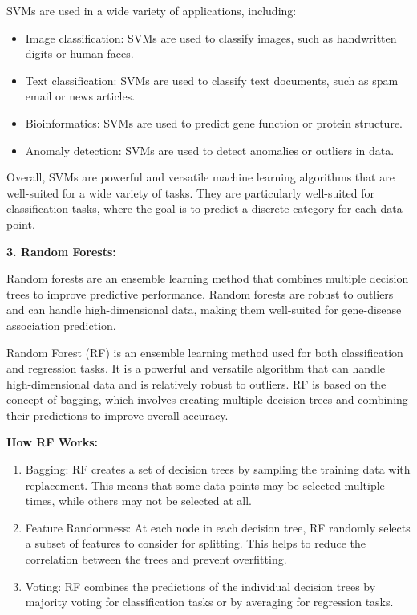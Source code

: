 SVMs are used in a wide variety of applications, including:

\begin{itemize}
    \item Image classification: SVMs are used to classify images, such as handwritten digits or human faces.

    \item Text classification: SVMs are used to classify text documents, such as spam email or news articles.

    \item Bioinformatics: SVMs are used to predict gene function or protein structure.

    \item Anomaly detection: SVMs are used to detect anomalies or outliers in data.

\end{itemize}
Overall, SVMs are powerful and versatile machine learning algorithms that are well-suited for a wide variety of tasks. They are particularly well-suited for classification tasks, where the goal is to predict a discrete category for each data point.

\textbf{3. Random Forests:}

Random forests are an ensemble learning method that combines multiple decision trees to improve predictive performance. Random forests are robust to outliers and can handle high-dimensional data, making them well-suited for gene-disease association prediction.

Random Forest (RF) is an ensemble learning method used for both classification and regression tasks. It is a powerful and versatile algorithm that can handle high-dimensional data and is relatively robust to outliers. RF is based on the concept of bagging, which involves creating multiple decision trees and combining their predictions to improve overall accuracy.

\textbf{How RF Works:}

\begin{enumerate}
    \item Bagging: RF creates a set of decision trees by sampling the training data with replacement. This means that some data points may be selected multiple times, while others may not be selected at all.

    \item Feature Randomness: At each node in each decision tree, RF randomly selects a subset of features to consider for splitting. This helps to reduce the correlation between the trees and prevent overfitting.

    \item Voting: RF combines the predictions of the individual decision trees by majority voting for classification tasks or by averaging for regression tasks.

\end{enumerate}

